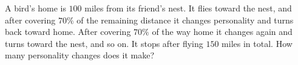 A bird's home is $100$ miles from its friend's nest. It flies toward the nest, and after covering $70\%$ of the remaining distance it changes personality and turns back toward home. After covering $70\%$ of the way home it changes again and turns toward the nest, and so on. It stops after flying $150$ miles in total. How many personality changes does it make?
